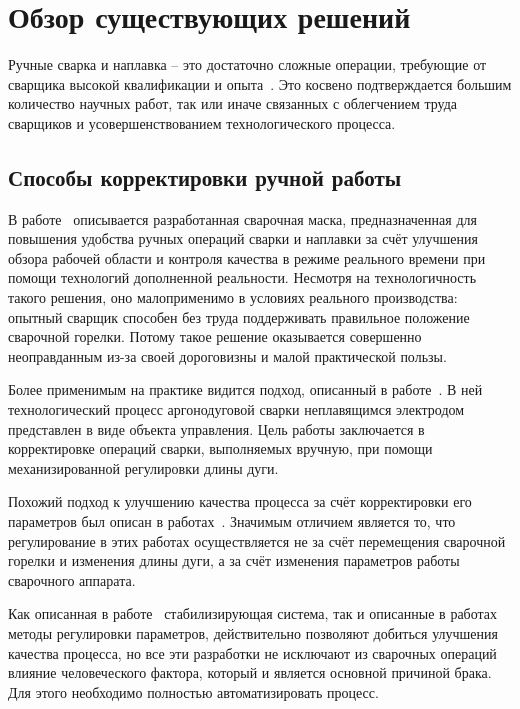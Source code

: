 \chapter{Обзор существующих решений} \label{ch:SolutionsOverview}
Ручные сварка и наплавка -- это достаточно сложные операции, требующие от сварщика высокой квалификации и опыта~\cite{Hattori_1965, Seregina_2018}.
Это косвено подтверждается большим количество научных работ, так или иначе связанных с облегчением труда сварщиков и усовершенствованием технологического процесса.


\section{Способы корректировки ручной работы}
В работе~\cite{Aiteanu} описывается разработанная сварочная маска, предназначенная для повышения удобства ручных операций сварки и наплавки за счёт улучшения обзора рабочей области и контроля качества в режиме реального времени при помощи технологий дополненной реальности.
Несмотря на технологичность такого решения, оно малоприменимо в условиях реального производства: опытный сварщик способен без труда поддерживать правильное положение сварочной горелки.
Потому такое решение оказывается совершенно неоправданным из-за своей дороговизны и малой практической пользы.

Более применимым на практике видится подход, описанный в работе~\cite{Muller_2018}.
В ней технологический процесс аргонодуговой сварки неплавящимся электродом представлен в виде объекта управления.
Цель работы заключается в корректировке операций сварки, выполняемых вручную, при помощи механизированной регулировки длины дуги.

Похожий подход к улучшению качества процесса за счёт корректировки его параметров был описан в работах~\cite{Yang_2020, Dai_2011, Xu_2008}.
Значимым отличием является то, что регулирование в этих работах осуществляется не за счёт перемещения сварочной горелки и изменения длины дуги, а за счёт изменения параметров работы сварочного аппарата.

Как описанная в работе~\cite{Muller_2018} стабилизирующая система, так и описанные в работах~\cite{Yang_2020, Dai_2011, Xu_2008} методы регулировки параметров, действительно позволяют добиться улучшения качества процесса, но все эти разработки не исключают из сварочных операций влияние человеческого фактора, который и является основной причиной брака.
Для этого необходимо полностью автоматизировать процесс.


